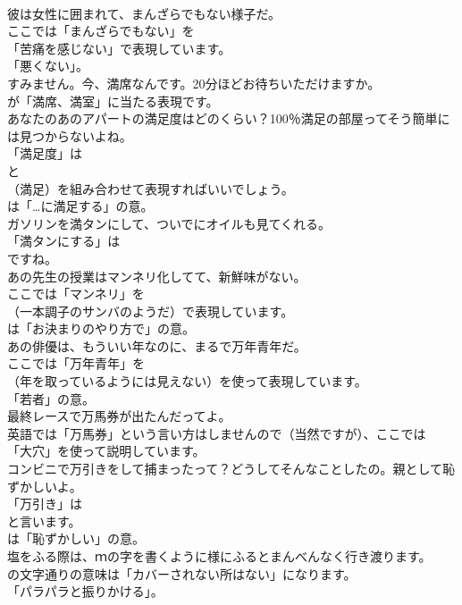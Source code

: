 \documentclass[8pt]{extreport}
\begin{document}
\begin{CJK}{UTF8}{min}
\\	彼は女性に囲まれて、まんざらでもない様子だ。 
\\	ここでは「まんざらでもない」を
\\	「苦痛を感じない」で表現しています。
\\	「悪くない」。	
\\	すみません。今、満席なんです。20分ほどお待ちいただけますか。 
\\	が「満席、満室」に当たる表現です。	
\\	あなたのあのアパートの満足度はどのくらい？100％満足の部屋ってそう簡単には見つからないよね。 
\\	「満足度」は 
\\	と 
\\	（満足）を組み合わせて表現すればいいでしょう。
\\	は「…に満足する」の意。	
\\	ガソリンを満タンにして、ついでにオイルも見てくれる。 
\\	「満タンにする」は
\\	ですね。	
\\	あの先生の授業はマンネリ化してて、新鮮味がない。 
\\	ここでは「マンネリ」を 
\\	（一本調子のサンバのようだ）で表現しています。
\\	は「お決まりのやり方で」の意。	
\\	あの俳優は、もういい年なのに、まるで万年青年だ。 
\\	ここでは「万年青年」を
\\	（年を取っているようには見えない）を使って表現しています。
\\	「若者」の意。	
\\	最終レースで万馬券が出たんだってよ。 
\\	英語では「万馬券」という言い方はしませんので（当然ですが）、ここでは
\\	「大穴」を使って説明しています。	
\\	コンビニで万引きをして捕まったって？どうしてそんなことしたの。親として恥ずかしいよ。 
\\	「万引き」は
\\	と言います。
\\	は「恥ずかしい」の意。	
\\	塩をふる際は、ｍの字を書くように様にふるとまんべんなく行き渡ります。 
\\	の文字通りの意味は「カバーされない所はない」になります。
\\	「パラパラと振りかける」。	

\end{CJK}
\end{document}
